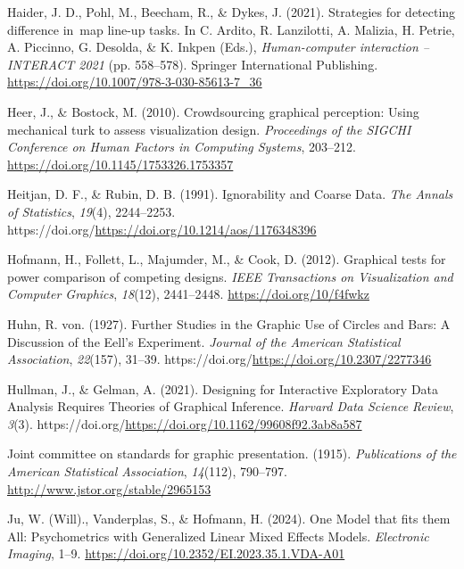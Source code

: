 \documentclass[
  10pt,
  letterpaper,
  DIV=11,
  numbers=noendperiod]{scrartcl}
\newlength{\cslhangindent}
\newenvironment{CSLReferences}[2] %
 {\begin{list}{}{%
  \setlength{\itemindent}{0pt}
  \setlength{\leftmargin}{0pt}
  \setlength{\parsep}{0pt}
  \ifodd #1
   \setlength{\leftmargin}{\cslhangindent}
   \setlength{\itemindent}{-1\cslhangindent}
  \fi
  \setlength{\itemsep}{#2\baselineskip}}}
 {\end{list}}
\begin{document}
\begin{CSLReferences}{1}{0}
Haider, J. D., Pohl, M., Beecham, R., \& Dykes, J. (2021). Strategies
for detecting difference in~map line-up tasks. In C. Ardito, R.
Lanzilotti, A. Malizia, H. Petrie, A. Piccinno, G. Desolda, \& K. Inkpen
(Eds.), \emph{Human-computer interaction -- {INTERACT} 2021} (pp.
558--578). Springer International Publishing.
\url{https://doi.org/10.1007/978-3-030-85613-7_36}

Heer, J., \& Bostock, M. (2010). Crowdsourcing graphical perception:
Using mechanical turk to assess visualization design. \emph{Proceedings
of the {SIGCHI} Conference on Human Factors in Computing Systems},
203--212. \url{https://doi.org/10.1145/1753326.1753357}

Heitjan, D. F., \& Rubin, D. B. (1991). Ignorability and {Coarse}
{Data}. \emph{The Annals of Statistics}, \emph{19}(4), 2244--2253.
https://doi.org/\url{https://doi.org/10.1214/aos/1176348396}

Hofmann, H., Follett, L., Majumder, M., \& Cook, D. (2012). Graphical
tests for power comparison of competing designs. \emph{IEEE Transactions
on Visualization and Computer Graphics}, \emph{18}(12), 2441--2448.
\url{https://doi.org/10/f4fwkz}

Huhn, R. von. (1927). Further {Studies} in the {Graphic} {Use} of
{Circles} and {Bars}: {A} {Discussion} of the {Eell}'s {Experiment}.
\emph{Journal of the American Statistical Association}, \emph{22}(157),
31--39. https://doi.org/\url{https://doi.org/10.2307/2277346}

Hullman, J., \& Gelman, A. (2021). Designing for {Interactive}
{Exploratory} {Data} {Analysis} {Requires} {Theories} of {Graphical}
{Inference}. \emph{Harvard Data Science Review}, \emph{3}(3).
https://doi.org/\url{https://doi.org/10.1162/99608f92.3ab8a587}

Joint committee on standards for graphic presentation. (1915).
\emph{Publications of the American Statistical Association},
\emph{14}(112), 790--797. \url{http://www.jstor.org/stable/2965153}

Ju, W. (Will)., Vanderplas, S., \& Hofmann, H. (2024). One {Model} that
fits them {All}: {Psychometrics} with {Generalized Linear Mixed Effects
Models}. \emph{Electronic Imaging}, 1--9.
\url{https://doi.org/10.2352/EI.2023.35.1.VDA-A01}


\end{CSLReferences}
\end{document}
